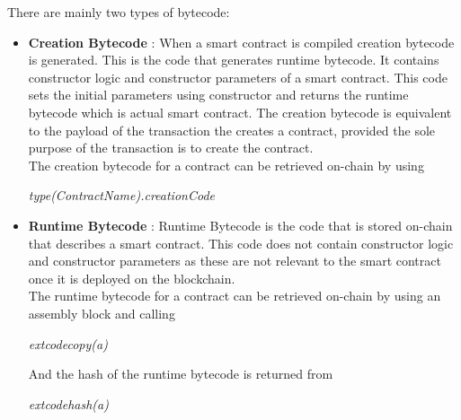 There are mainly two types of bytecode\cite{bytecode1}:
\begin{itemize}
    \item \textbf{Creation Bytecode} : When a smart contract is compiled creation bytecode is generated. This is the code that generates runtime bytecode. It contains constructor logic and constructor parameters of a smart contract. This code sets the initial parameters using constructor and returns the runtime bytecode which is actual smart contract. The creation bytecode is equivalent to the payload of the transaction the creates a contract, provided the sole purpose of the transaction is to create the contract.\\

    The creation bytecode for a contract can be retrieved on-chain by using
    \begin{center}
        \emph{type(ContractName).creationCode}
    \end{center} 
    \item \textbf{Runtime Bytecode} : Runtime  Bytecode is the code that is stored on-chain that describes a smart contract. This code does not contain constructor logic and constructor parameters as these are not relevant to the smart contract once it is deployed on the blockchain. \\
    The runtime bytecode for a contract can be retrieved on-chain by using an assembly block and calling
    \begin{center}
        \emph{extcodecopy(a)}
    \end{center} 
    And the hash of the runtime bytecode is returned from 
    \begin{center}
        \emph{extcodehash(a)}
    \end{center} 
\end{itemize}
